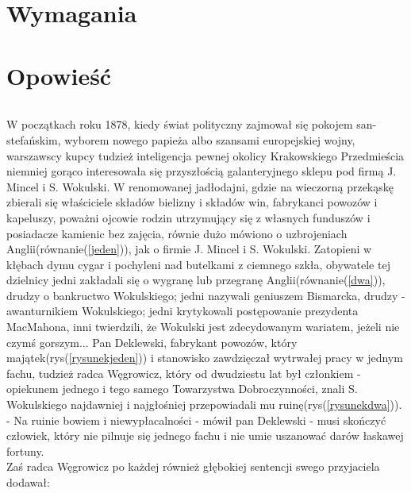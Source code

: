 \documentclass[11pt]{article}
\begin{document}
\maketitle

\newpage
\part{Wymagania}


\newpage
\part{Opowieść}

\paragraph{}
W początkach roku 1878\cite{a}, kiedy świat polityczny zajmował się pokojem san-stefańskim, 
wyborem nowego papieża albo szansami europejskiej wojny, warszawscy kupcy tudzież inteligencja pewnej 
okolicy Krakowskiego Przedmieścia niemniej gorąco interesowała się przyszłością galanteryjnego sklepu pod firmą J. Mincel i S. Wokulski.
W renomowanej jadłodajni, gdzie na wieczorną przekąskę zbierali się właściciele składów bielizny i składów win, 
fabrykanci powozów i kapeluszy, poważni ojcowie rodzin utrzymujący się z własnych funduszów i posiadacze kamienic bez zajęcia, 
równie dużo mówiono o uzbrojeniach Anglii(równanie(\ref{jeden})), jak o firmie J. Mincel i S. Wokulski. Zatopieni w kłębach dymu cygar i pochyleni nad butelkami 
z ciemnego szkła, obywatele tej dzielnicy jedni zakładali się o wygranę lub przegranę Anglii(równanie(\ref{dwa})), drudzy o bankructwo Wokulskiego; 
jedni nazywali geniuszem Bismarcka, drudzy - awanturnikiem Wokulskiego; jedni krytykowali postępowanie prezydenta MacMahona, 
inni twierdzili, że Wokulski jest zdecydowanym wariatem, jeżeli nie czymś gorszym...
Pan Deklewski, fabrykant powozów, który majątek(rys(\ref{rysunekjeden})) i stanowisko zawdzięczał wytrwałej pracy w jednym fachu, 
tudzież radca Węgrowicz, który od dwudziestu lat był członkiem - opiekunem jednego i tego samego Towarzystwa Dobroczynności, 
znali S. Wokulskiego\cite{b} najdawniej i najgłośniej przepowiadali mu ruinę(rys(\ref{rysunekdwa})).\\
- Na ruinie bowiem i niewypłacalności - mówił pan Deklewski - musi skończyć człowiek, który nie pilnuje się jednego fachu i nie umie uszanować darów łaskawej fortuny.\\
Zaś radca Węgrowicz po każdej również głębokiej sentencji swego przyjaciela dodawał:\\
\end{document}
